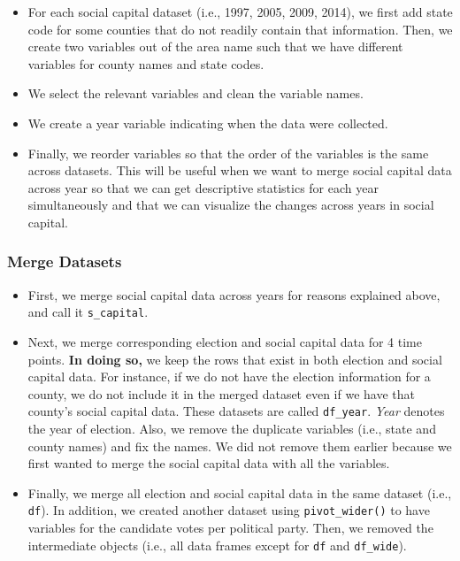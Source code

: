 \documentclass[
  english,
  man]{apa6}
\begin{document}
\begin{itemize}
\item
  For each social capital dataset (i.e., 1997, 2005, 2009, 2014), we first add state code for some counties that do not readily contain that information. Then, we create two variables out of the area name such that we have different variables for county names and state codes.
\item
  We select the relevant variables and clean the variable names.
\item
  We create a year variable indicating when the data were collected.
\item
  Finally, we reorder variables so that the order of the variables is the same across datasets. This will be useful when we want to merge social capital data across year so that we can get descriptive statistics for each year simultaneously and that we can visualize the changes across years in social capital.
\end{itemize}

\hypertarget{merge-datasets}{%
\subsubsection{Merge Datasets}\label{merge-datasets}}

\begin{itemize}
\item
  First, we merge social capital data across years for reasons explained above, and call it \texttt{s\_capital}.
\item
  Next, we merge corresponding election and social capital data for 4 time points. \textbf{In doing so,} we keep the rows that exist in both election and social capital data. For instance, if we do not have the election information for a county, we do not include it in the merged dataset even if we have that county's social capital data. These datasets are called \texttt{df\_year}. \emph{Year} denotes the year of election. Also, we remove the duplicate variables (i.e., state and county names) and fix the names. We did not remove them earlier because we first wanted to merge the social capital data with all the variables.
\item
  Finally, we merge all election and social capital data in the same dataset (i.e., \texttt{df}). In addition, we created another dataset using \texttt{pivot\_wider()} to have variables for the candidate votes per political party. Then, we removed the intermediate objects (i.e., all data frames except for \texttt{df} and \texttt{df\_wide}).
\end{itemize}
\end{document}
